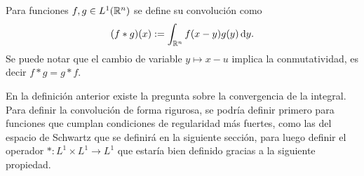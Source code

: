 \begin{definition}[Convoluciones]
    Para funciones $f,g\in L^1(\mathbb{R}^n)$ se define su convolución como 
    \begin{equation*}
        (f*g)(x) := \int_{\mathbb{R}^n} f(x-y)g(y)\mathop{}\!\mathrm{d} y.
    \end{equation*}
    Se puede notar que el cambio de variable $y\mapsto x-u$ implica la
    conmutatividad, es decir $f*g=g*f$.
\end{definition}
\begin{remark}
    En la definición anterior existe la pregunta sobre la convergencia de la
    integral. Para definir la convolución de forma rigurosa, se podría definir 
    primero para funciones que cumplan condiciones de regularidad más 
    fuertes, como las del espacio de Schwartz que se definirá en la siguiente
    sección, para luego definir el operador $*:L^1\times L^1 \rightarrow L^1$
    que estaría bien definido gracias a la siguiente propiedad.
\end{remark}

